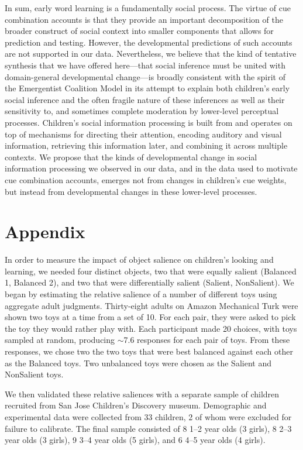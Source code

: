 \documentclass[man,floatsintext]{apa6}
\begin{document}
In sum, early word learning is a fundamentally social process. The virtue of cue combination accounts is that they provide an important decomposition of the broader construct of social context into smaller components that allows for prediction and testing. However, the developmental predictions of such accounts are not supported in our data. Nevertheless, we believe that the kind of tentative synthesis that we have offered here---that social inference must be united with domain-general developmental change---is broadly consistent with the spirit of the Emergentist Coalition Model in its attempt to explain both children's early social inference and the often fragile nature of these inferences as well as their sensitivity to, and sometimes complete moderation by lower-level perceptual processes. Children's social information processing is built from and operates on top of mechanisms for directing their attention, encoding auditory and visual information, retrieving this information later, and combining it across multiple contexts. We propose that the kinds of developmental change in social information processing we observed in our data, and in the data used to motivate cue combination accounts, emerges not from changes in children's cue weights, but instead from developmental changes in these lower-level processes.

\section{Appendix}
\renewcommand\thefigure{A\arabic{figure}}   
\setcounter{figure}{0}    

In order to measure the impact of object salience on children's looking and learning, we needed four distinct objects, two that were equally salient (Balanced 1, Balanced 2), and two that were differentially salient (Salient, NonSalient). We began by estimating the relative salience of a number of different toys using aggregate adult judgments. Thirty-eight adults on Amazon Mechanical Turk were shown two toys at a time from a set of 10. For each pair, they were asked to pick the toy they would rather play with. Each participant made 20 choices, with toys sampled at random, producing $\sim$7.6 responses for each pair of toys. From these responses, we chose two  the two toys that were best balanced against each other as the Balanced toys. Two unbalanced toys were chosen as the Salient and NonSalient toys.

We then validated these relative saliences with a separate sample of children recruited from San Jose Children's Discovery museum. Demographic and experimental data were collected from 33 children, 2 of whom were excluded for failure to calibrate. The final sample consisted of 8 1--2 year olds (3 girls), 8 2--3 year olds (3 girls), 9 3--4 year olds (5 girls), and 6 4--5 year olds (4 girls).
\end{document}
